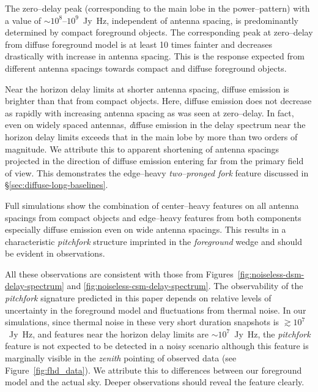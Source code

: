 \documentclass[preprint2,iop,numberedappendix]{emulateapj}
\begin{document}
The zero--delay peak (corresponding to the main lobe in the power--pattern) with a value of $\sim 10^8$--$10^9$~Jy~Hz, independent of antenna spacing, is predominantly determined by compact foreground objects. The corresponding peak at zero--delay from diffuse foreground model is at least 10 times fainter and decreases drastically with increase in antenna spacing. This is the response expected from different antenna spacings towards compact and diffuse foreground objects. 

Near the horizon delay limits at shorter antenna spacing, diffuse emission is brighter than that from compact objects. Here, diffuse emission does not decrease as rapidly with increasing antenna spacing as was seen at zero--delay. In fact, even on widely spaced antennas, {\emph diffuse emission in the delay spectrum near the horizon delay limits exceeds that in the main lobe by more than two orders of magnitude}. We attribute this to apparent shortening of antenna spacings projected in the direction of diffuse emission entering far from the primary field of view. This demonstrates the edge--heavy {\it two--pronged fork} feature discussed in \S\ref{sec:diffuse-long-baselines}.

Full simulations show the combination of center--heavy features on all antenna spacings from compact objects and edge--heavy features from both components especially diffuse emission even on wide antenna spacings.  This results in a characteristic {\it pitchfork} structure imprinted in the {\it foreground} wedge and should be evident in observations.

All these observations are consistent with those from Figures~\ref{fig:noiseless-dsm-delay-spectrum} and \ref{fig:noiseless-csm-delay-spectrum}. The observability of the {\it pitchfork} signature predicted in this paper depends on relative levels of uncertainty in the foreground model and fluctuations from thermal noise. In our simulations, since thermal noise in these very short duration snapshots is $\gtrsim 10^7$~Jy~Hz, and features near the horizon delay limits are $\sim 10^7$~Jy~Hz, the {\it pitchfork} feature is not expected to be detected in a noisy scenario although this feature is marginally visible in the {\it zenith} pointing of observed data (see Figure~\ref{fig:fhd_data}). We attribute this to differences between our foreground model and the actual sky.  Deeper observations should reveal the feature clearly.
\end{document}
